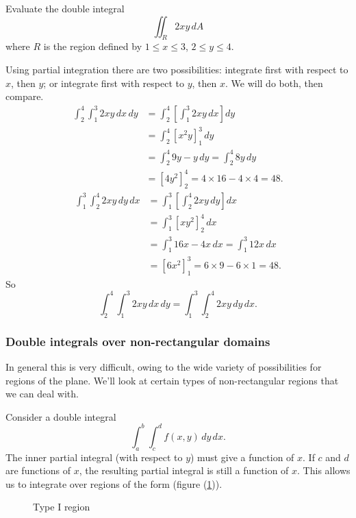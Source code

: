   \begin{example}
    Evaluate the double integral
      \[
        \iint_R 2xy \, dA
      \]
    where $R$ is the region defined by $1 \leq x \leq 3$, $2 \leq y \leq 4$.

    Using partial integration there are two possibilities: integrate first with respect to $x$, then $y$; or integrate first with respect to $y$, then $x$.  We will do both, then compare.
    \begin{align*}
      \int_2^4 \int_1^3 2xy \, dx \, dy & = \int_2^4 \left[ \int_1^3 2xy \, dx \right] dy  \\
      & = \int_2^4 \left[ x^2 y \right]_1^3 \, dy  \\
      & = \int_2^4 9y - y \, dy = \int_2^4 8y \, dy  \\
      & = \left[ 4y^2 \right]_2^4 = 4 \times 16 - 4 \times 4 = 48.
    \end{align*}
    \begin{align*}
      \int_1^3 \int_2^4 2xy \, dy \, dx & = \int_1^3 \left[ \int_2^4 2xy \, dy \right] dx  \\
      & = \int_1^3 \left[ xy^2 \right]_2^4 \, dx  \\
      & = \int_1^3 16x - 4x \, dx = \int_1^3 12x \, dx  \\
      & = \left[ 6x^2 \right]_1^3 = 6 \times 9 - 6 \times 1 = 48.
    \end{align*}
  So
  \[
    \int_2^4 \int_1^3 2xy \, dx \, dy = \int_1^3 \int_2^4 2xy \, dy \, dx.
  \]
  \end{example}
	

  \subsubsection*{Double integrals over non-rectangular domains}
	

  In general this is very difficult, owing to the wide variety of possibilities for regions of the plane.  We'll look at certain types of non-rectangular regions that we can deal with.

  Consider a double integral
    \[
      \int_a^b \int_c^d f(x, y) \, dy \, dx.
    \]
  The inner partial integral (with respect to $y$) must give a function of $x$.  If $c$ and $d$ are functions of $x$, the resulting partial integral is still a function of $x$.  This allows us to integrate over regions of the form (figure (\ref{typeiregion})).
  \begin{figure}[H]
    \centering
    \def\svgwidth{0.4\columnwidth}
    
    \caption{Type I region}
    \label{typeiregion}
  \end{figure}

